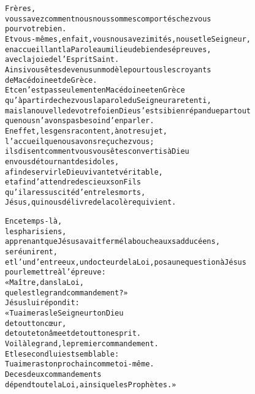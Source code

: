 \documentclass[RG2023_CarnetCommun.tex]{subfiles}
\begin{document}




\begin{alltt}\normalfont
Frères,
    vous savez comment nous nous sommes comportés chez vous
pour votre bien.
    Et vous-mêmes, en fait, vous nous avez imités, nous et le Seigneur,
en accueillant la Parole au milieu de bien des épreuves,
avec la joie de l’Esprit Saint.
    Ainsi vous êtes devenus un modèle pour tous les croyants
de Macédoine et de Grèce.
    Et ce n’est pas seulement en Macédoine et en Grèce
qu’à partir de chez vous la parole du Seigneur a retenti,
mais la nouvelle de votre foi en Dieu s’est si bien répandue partout
que nous n’avons pas besoin d’en parler.
    En effet, les gens racontent, à notre sujet,
l’accueil que nous avons reçu chez vous ;
ils disent comment vous vous êtes convertis à Dieu
en vous détournant des idoles,
afin de servir le Dieu vivant et véritable,
    et afin d’attendre des cieux son Fils
qu’il a ressuscité d’entre les morts,
Jésus, qui nous délivre de la colère qui vient.
\end{alltt}





\begin{alltt}\normalfont
En ce temps-là,
    les pharisiens,
apprenant que Jésus avait fermé la bouche aux sadducéens,
se réunirent,
    et l’un d’entre eux, un docteur de la Loi, posa une question à Jésus
pour le mettre à l’épreuve :
    « Maître, dans la Loi,
quel est le grand commandement ? »
    Jésus lui répondit :
« Tu aimeras le Seigneur ton Dieu
de tout ton cœur,
de toute ton âme et de tout ton esprit.
    Voilà le grand, le premier commandement.
    Et le second lui est semblable :
Tu aimeras ton prochain comme toi-même.
    De ces deux commandements
dépend toute la Loi, ainsi que les Prophètes. »
\end{alltt}
\end{document}
